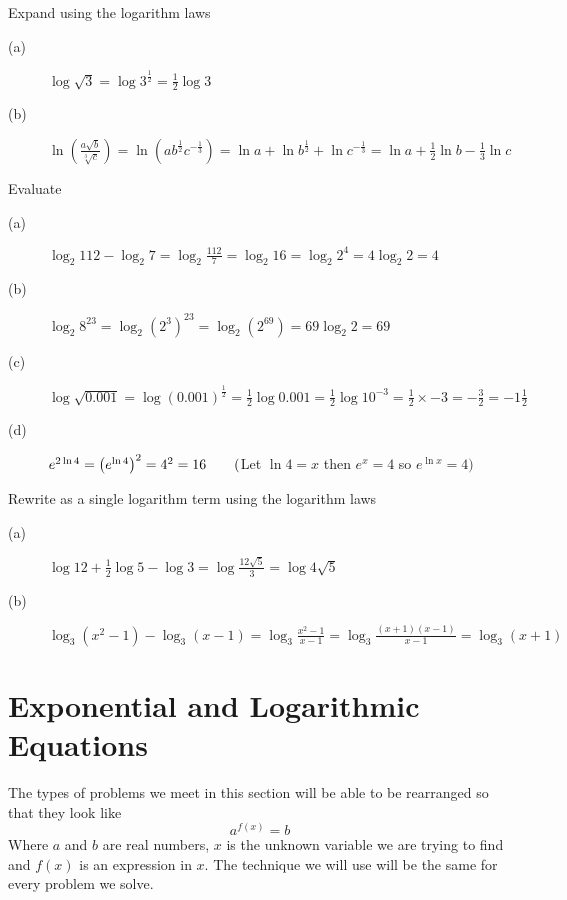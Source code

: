 \example
Expand using the logarithm laws 
\begin{description}
	\item [(a)] $\log  \sqrt{3} =\log  3^{\frac{1}{2}} =\frac{1}{2} \log  3$ 
	
	\item [(b)] $\ln  \genfrac{(}{)}{}{}{a \sqrt{b}}{\sqrt[{3}]{c}} =\ln  \left (a b^{\frac{1}{2}} c^{ -\frac{1}{3}}\right ) =\ln  a +\ln  b^{\frac{1}{2}} +\ln  c^{ -\frac{1}{3}} =\ln  a +\frac{1}{2} \ln  b -\frac{1}{3} \ln  c$ \end{description}

\example Evaluate
\begin{description}
	\item [(a)] $\log _{2} 112 -\log _{2} 7 =\log _{2} \frac{112}{7} =\log _{2} 16 =\log _{2} 2^{4} =4 \log _{2} 2 =4$ 
	
	\item [(b)] $\log _{2} 8^{23} =\log _{2} \left (2^{3}\right )^{23} =\log _{2} \left (2^{69}\right ) =69 \log _{2} 2 =69$ 
	
	\item [(c)] $\log  \sqrt{0.001} =\log  \left (0.001\right )^{\frac{1}{2}} =\frac{1}{2} \log  0.001 =\frac{1}{2} \log  10^{ -3} =\frac{1}{2} \times  -3 = -\frac{3}{2} = -1\frac{1}{2}$ 
	
	\item [(d)] $e^{2 \ln  4} =\left (e^{\ln  4}\right )^{2} =4^{2} =16\text{\quad \quad }($Let $\ln  4 =x$ then $e^{x} =4$ so $e^{\ln  x} =4)$ \end{description}

\example Rewrite as a single logarithm term using the logarithm laws 
\begin{description}
	\item [(a)] $\log  12 +\frac{1}{2} \log  5 -\log  3 =\log  \frac{12 \sqrt{5}}{3} =\log  4 \sqrt{5}$ 
	
	\item [(b)] $\log _{3} \left (x^{2} -1\right ) -\log _{3} \left (x -1\right ) =\log _{3} \frac{x^{2} -1}{x -1} =\log _{3} \frac{\left (x +1\right ) \left (x -1\right )}{x -1} =\log _{3} \left (x +1\right )$ \end{description}



\section{Exponential and Logarithmic Equations}
The types of problems we meet in this section will be able to be rearranged so that they look like
\begin{equation*}a^{f (x)} =b
\end{equation*}
Where $a$ and $b$ are real numbers, $x$ is the unknown variable we are trying to find and $f (x)$ is an expression in $x$. The technique we will use will be the same for every problem we solve. 

